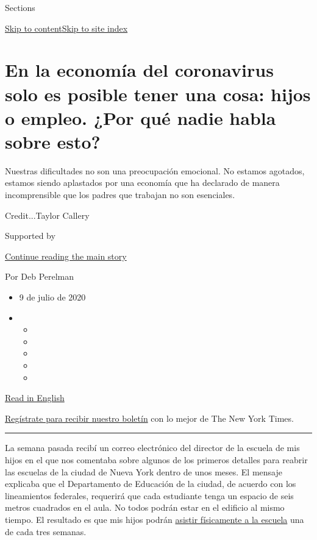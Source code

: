 Sections

\protect\hyperlink{site-content}{Skip to
content}\protect\hyperlink{site-index}{Skip to site index}

\hypertarget{en-la-economuxeda-del-coronavirus-solo-es-posible-tener-una-cosa-hijos-o-empleo-por-quuxe9-nadie-habla-sobre-esto}{%
\section{En la economía del coronavirus solo es posible tener una cosa:
hijos o empleo. ¿Por qué nadie habla sobre
esto?}\label{en-la-economuxeda-del-coronavirus-solo-es-posible-tener-una-cosa-hijos-o-empleo-por-quuxe9-nadie-habla-sobre-esto}}

Nuestras dificultades no son una preocupación emocional. No estamos
agotados, estamos siendo aplastados por una economía que ha declarado de
manera incomprensible que los padres que trabajan no son esenciales.

Credit...Taylor Callery

Supported by

\protect\hyperlink{after-sponsor}{Continue reading the main story}

Por Deb Perelman

\begin{itemize}
\item
  9 de julio de 2020
\item
  \begin{itemize}
  \item
  \item
  \item
  \item
  \item
  \end{itemize}
\end{itemize}

\href{https://www.nytimes3xbfgragh.onion/2020/07/02/business/covid-economy-parents-kids-career-homeschooling.html}{Read
in English}

\href{https://www.nytimes3xbfgragh.onion/newsletters/el-times}{Regístrate
para recibir nuestro boletín} con lo mejor de The New York Times.

\begin{center}\rule{0.5\linewidth}{\linethickness}\end{center}

La semana pasada recibí un correo electrónico del director de la escuela
de mis hijos en el que nos comentaba sobre algunos de los primeros
detalles para reabrir las escuelas de la ciudad de Nueva York dentro de
unos meses. El mensaje explicaba que el Departamento de Educación de la
ciudad, de acuerdo con los lineamientos federales, requerirá que cada
estudiante tenga un espacio de seis metros cuadrados en el aula. No
todos podrán estar en el edificio al mismo tiempo. El resultado es que
mis hijos podrán
\href{https://www.nytimes3xbfgragh.onion/2020/06/26/us/coronavirus-schools-reopen-fall.html}{asistir
físicamente a la escuela} una de cada tres semanas.


